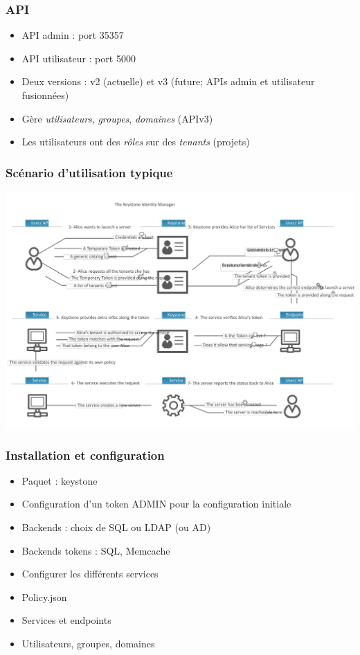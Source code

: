   \begin{frame}
    \frametitle{API}
    \begin{itemize}
      \item API admin : port 35357
      \item API utilisateur : port 5000
      \item Deux versions : v2 (actuelle) et v3 (future; APIs admin et utilisateur fusionnées)
      \item Gère \textit{utilisateurs}, \textit{groupes}, \textit{domaines} (APIv3)
      \item Les utilisateurs ont des \textit{rôles} sur des \textit{tenants} (projets)
    \end{itemize}
  \end{frame}

  \begin{frame}
    \frametitle{Scénario d'utilisation typique}
    \includegraphics[width=\linewidth]{images/keystone-scenario.png}
  \end{frame}

  \begin{frame}
    \frametitle{Installation et configuration}
    \begin{itemize}
      \item Paquet : keystone
      \item Configuration d'un token ADMIN pour la configuration initiale
      \item Backends : choix de SQL ou LDAP (ou AD)
      \item Backends tokens : SQL, Memcache
      \item Configurer les différents services
      \item Policy.json
      \item Services et endpoints
      \item Utilisateurs, groupes, domaines
    \end{itemize}
  \end{frame}


